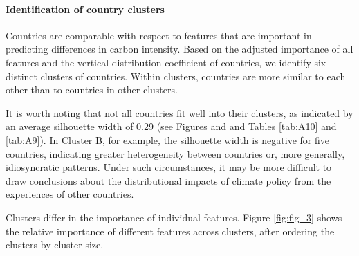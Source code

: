 \documentclass[12pt, a4paper]{article}
\begin{document}
\clearpage

\paragraph{Identification of country clusters}

Countries are comparable with respect to features that are important in predicting differences in carbon intensity. Based on the adjusted importance of all features and the vertical distribution coefficient of countries, we identify six distinct clusters of countries. Within clusters, countries are more similar to each other than to countries in other clusters. 

It is worth noting that not all countries fit well into their clusters, as indicated by an average silhouette width of 0.29 (see Figures  and  and Tables \ref{tab:A10} and \ref{tab:A9}). In Cluster B, for example, the silhouette width is negative for five countries, indicating greater heterogeneity between countries or, more generally, idiosyncratic patterns. Under such circumstances, it may be more difficult to draw conclusions about the distributional impacts of climate policy from the experiences of other countries. 

Clusters differ in the importance of individual features. Figure \ref{fig:fig_3} shows the relative importance of different features across clusters, after ordering the clusters by cluster size. 
\end{document}
